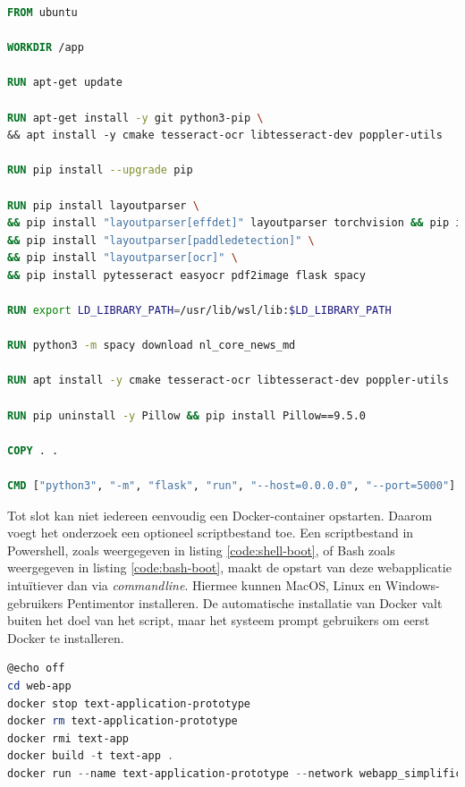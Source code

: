\begin{lstlisting}[language=Dockerfile, caption={Dockerfile voor Pentimentor.}, label={code:dockerfile}]
FROM ubuntu

WORKDIR /app

RUN apt-get update

RUN apt-get install -y git python3-pip \ 
&& apt install -y cmake tesseract-ocr libtesseract-dev poppler-utils 

RUN pip install --upgrade pip

RUN pip install layoutparser \
&& pip install "layoutparser[effdet]" layoutparser torchvision && pip install "git+https://github.com/facebookresearch/detectron2.git@v0.5#egg=detectron2" \
&& pip install "layoutparser[paddledetection]" \
&& pip install "layoutparser[ocr]" \
&& pip install pytesseract easyocr pdf2image flask spacy

RUN export LD_LIBRARY_PATH=/usr/lib/wsl/lib:$LD_LIBRARY_PATH

RUN python3 -m spacy download nl_core_news_md

RUN apt install -y cmake tesseract-ocr libtesseract-dev poppler-utils

RUN pip uninstall -y Pillow && pip install Pillow==9.5.0

COPY . .

CMD ["python3", "-m", "flask", "run", "--host=0.0.0.0", "--port=5000"]
\end{lstlisting}

Tot slot kan niet iedereen eenvoudig een Docker-container opstarten. Daarom voegt het onderzoek een optioneel scriptbestand toe. Een scriptbestand in Powershell, zoals weergegeven in listing \ref{code:shell-boot}, of Bash zoals weergegeven in listing \ref{code:bash-boot}, maakt de opstart van deze webapplicatie intuïtiever dan via \textit{commandline}. Hiermee kunnen MacOS, Linux en Windows-gebruikers Pentimentor installeren. De automatische installatie van Docker valt buiten het doel van het script, maar het systeem prompt gebruikers om eerst Docker te installeren.

\begin{lstlisting}[language=Powershell, caption={Script voor het opstarten van de Docker-container voor Windows-gebruikers}, label={code:shell-boot}]
@echo off
cd web-app
docker stop text-application-prototype
docker rm text-application-prototype
docker rmi text-app
docker build -t text-app .
docker run --name text-application-prototype --network webapp_simplification -d -p 5000:5000 text-app
\end{lstlisting}

